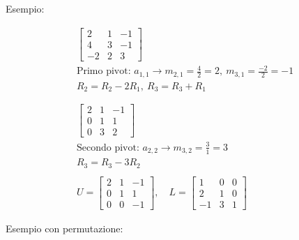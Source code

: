 \documentclass{article}
\begin{document}
Esempio:

\begin{align*}
    &\begin{bmatrix}
        2 & 1 & -1\\
        4 & 3 & -1\\
        -2 & 2 & 3
    \end{bmatrix}\\
    &\text{Primo pivot: }a_{1,1}\rightarrow m_{2,1}=\frac{4}{2}=2,\ m_{3,1}=\frac{-2}{2}=-1\\
    &R_2=R_2-2R_1,\ R_3=R_3+R_1\\\\\\
    &\begin{bmatrix}
        2 & 1 & -1\\
        0 & 1 & 1\\
        0 & 3 & 2
    \end{bmatrix}\\
    &\text{Secondo pivot: }a_{2,2}\rightarrow m_{3,2}=\frac{3}{1}=3\\
    &R_3=R_3-3R_2\\
    \\
    &U=\begin{bmatrix}
        2 & 1 & -1\\
        0 & 1 & 1\\
        0 & 0 & -1
    \end{bmatrix},\quad L=
    \begin{bmatrix}
        1 & 0 & 0\\
        2 & 1 & 0\\
        -1 & 3 & 1
    \end{bmatrix}
\end{align*}\newline

Esempio con permutazione:
\end{document}
